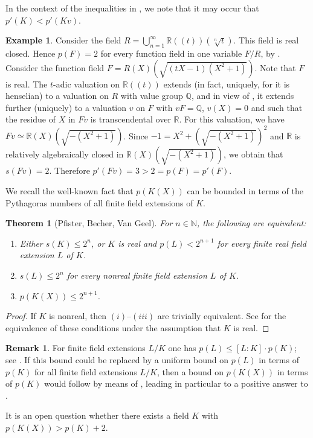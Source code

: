 \documentclass[12pt,leqno]{amsart}
\newcommand{\qq}{\mathbb Q}
\newcommand{\nat}{\mathbb{N}}
\newcommand{\rr}{\mathbb R}
\renewcommand{\leq}{\leqslant}
\numberwithin{equation}{section}
\newtheorem{thm}[equation]{Theorem}
\theoremstyle{definition}
\newtheorem{ex}[equation]{Example}
\newtheorem{rem}[equation]{Remark}
\theoremstyle{plain}
\begin{document}
In the context of the inequalities in , we note that it may occur that $p'(K)<p'(Kv)$.

\begin{ex}
Consider the field $R=\bigcup_{n=1}^\infty \rr(\!(t)\!)(\sqrt[n]{t})$.
This field is real closed. 
Hence $p(F)=2$ for every function field in one variable $F/R$, by \cite[Cor.~6.3.4]{Pfi95}.
Consider the function field $F=R(X)(\sqrt{(tX-1)(X^2+1)})$. Note that $F$ is real.
The $t$-adic valuation on $\rr(\!(t)\!)$ extends (in fact, uniquely, for it is henselian) to a valuation on $R$ with value group $\qq$, and
in view of \cite[Cor.~2.2.2 \& Cor.~3.2.3]{EP05}, it extends further (uniquely) to a valuation $v$ on $F$ with $vF=\qq$, $v(X)=0$ and such that the residue of $X$ in $Fv$ is transcendental over $\rr$.
For this valuation, we have $Fv\simeq \rr(X)(\sqrt{-(X^2+1)})$. Since $-1=X^2+(\sqrt{-(X^2+1)})^2$ and $\rr$ is relatively algebraically closed in $\rr(X)(\sqrt{-(X^2+1)})$, we obtain that $s(Fv)=2$. 
Therefore $p'(Fv)=3>2=p(F)=p'(F)$.
\end{ex}

We recall the well-known fact that $p(K(X))$ can be bounded in terms of the Pythagoras numbers of all finite field extensions of $K$.

\begin{thm}[Pfister, Becher, Van Geel] 
\label{T:Pfister-BVG}
For $n\in\nat$, the following are equivalent:
\begin{enumerate}[$(i)$]
\item Either $s(K)\leq 2^n$, or $K$ is real and 
$p(L)< 2^{n+1}$ for every finite real field extension $L$ of $K$. 
\item $s(L)\leq 2^n$ for every nonreal finite field extension $L$ of $K$. 
\item $p(K(X))\leq 2^{n+1}$.
\end{enumerate}
\end{thm}
\begin{proof}
If $K$ is nonreal, then $(i)$--$(iii)$ are trivially equivalent.
See \cite[Theorem 3.5]{BVG09} for the equivalence of these conditions under the assumption that $K$ is real.
\end{proof}

\begin{rem}
For finite field extensions $L/K$ one has 
$p(L)\leq [L:K]\cdot p(K)$; see \cite[Chap.~7, Prop.~1.13]{Pfi95}.
If this bound could be replaced by a uniform bound on $p(L)$ in terms of $p(K)$ for all finite field extensions $L/K$, then a bound on $p(K(X))$ in terms of $p(K)$ would follow by means of ,  leading in particular to a positive answer to .

It is an open question whether there exists a field $K$ with  $p(K(X))>p(K)+2$. 
\end{rem}
\end{document}
